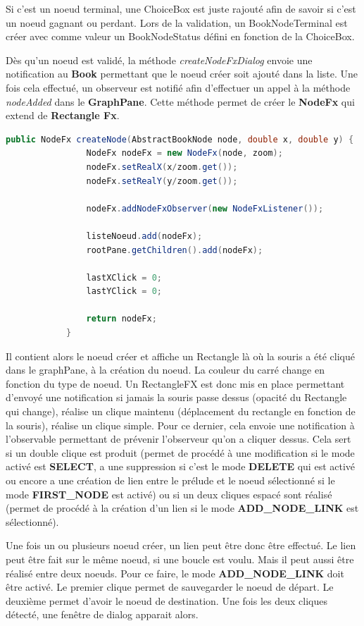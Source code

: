 			Si c'est un noeud terminal, une ChoiceBox est juste rajouté afin de savoir si c'est un noeud gagnant ou perdant. Lors de la validation, un BookNodeTerminal est créer avec comme valeur un BookNodeStatus défini en fonction de la ChoiceBox.

			Dès qu'un noeud est validé, la méthode \textit{createNodeFxDialog} envoie une notification au \textbf{Book} permettant que le noeud créer soit ajouté dans la liste. Une fois cela effectué, un observeur est notifié afin d'effectuer un appel à la méthode \textit{nodeAdded} dans le \textbf{GraphPane}. Cette méthode permet de créer le \textbf{NodeFx} qui extend de \textbf{Rectangle Fx}.

			\begin{lstlisting}[gobble=12, language=java, caption=Création du NodeFxDialog]
			public NodeFx createNode(AbstractBookNode node, double x, double y) {
				NodeFx nodeFx = new NodeFx(node, zoom);
				nodeFx.setRealX(x/zoom.get());
				nodeFx.setRealY(y/zoom.get());

				nodeFx.addNodeFxObserver(new NodeFxListener());

				listeNoeud.add(nodeFx);
				rootPane.getChildren().add(nodeFx);

				lastXClick = 0;
				lastYClick = 0;

				return nodeFx;
			}
			\end{lstlisting}

			Il contient alors le noeud créer et affiche un Rectangle là où la souris a été cliqué dans le graphPane, à la création du noeud. La couleur du carré change en fonction du type de noeud. Un RectangleFX est donc mis en place permettant d'envoyé une notification si jamais la souris passe dessus (opacité du Rectangle qui change), réalise un clique maintenu (déplacement du rectangle en fonction de la souris), réalise un clique simple. Pour ce dernier, cela envoie une notification à l'observable permettant de prévenir l'observeur qu'on a cliquer dessus. Cela sert si un double clique est produit (permet de procédé à une modification si le mode activé est \textbf{SELECT}, a une suppression si c'est le mode \textbf{DELETE} qui est activé ou encore a une création de lien entre le prélude et le noeud sélectionné si le mode \textbf{FIRST\_NODE} est activé) ou si un deux cliques espacé sont réalisé (permet de procédé à la création d'un lien si le mode \textbf{ADD\_NODE\_LINK} est sélectionné).


			Une fois un ou plusieurs noeud créer, un lien peut être donc être effectué. Le lien peut être fait sur le même noeud, si une boucle est voulu. Mais il peut aussi être réalisé entre deux noeuds. Pour ce faire, le mode \textbf{ADD\_NODE\_LINK} doit être activé. Le premier clique permet de sauvegarder le noeud de départ. Le deuxième permet d'avoir le noeud de destination. Une fois les deux cliques détecté, une fenêtre de dialog apparait alors.

